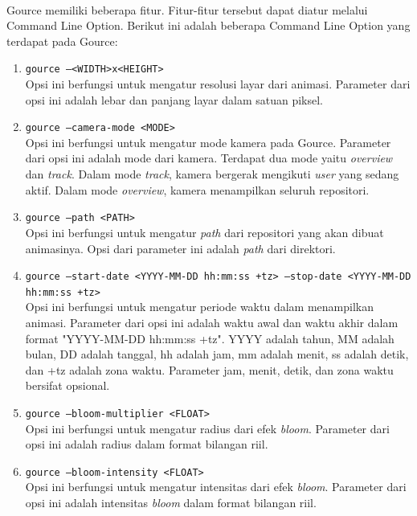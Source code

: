 \ \\
Gource memiliki beberapa fitur. Fitur-fitur tersebut dapat diatur melalui Command Line Option. Berikut ini adalah beberapa Command Line Option yang terdapat pada Gource:
\begin{enumerate}
\item \texttt{gource --<WIDTH>x<HEIGHT>}\\
Opsi ini berfungsi untuk mengatur resolusi layar dari animasi. Parameter dari opsi ini adalah lebar dan panjang layar dalam satuan piksel. 

\item \texttt{gource --camera-mode <MODE>}\\
Opsi ini berfungsi untuk mengatur mode kamera pada Gource. Parameter dari opsi ini adalah mode dari kamera. Terdapat dua mode yaitu \textit{overview} dan \textit{track}. Dalam mode \textit{track}, kamera bergerak mengikuti \textit{user} yang sedang aktif. Dalam mode \textit{overview}, kamera menampilkan seluruh repositori.

\item \texttt{gource --path <PATH>}\\
Opsi ini berfungsi untuk mengatur \textit{path} dari repositori yang akan dibuat animasinya. Opsi dari parameter ini adalah \textit{path} dari direktori.

\item \texttt{gource --start-date <YYYY-MM-DD hh:mm:ss +tz> --stop-date <YYYY-MM-DD hh:mm:ss +tz>}\\
Opsi ini berfungsi untuk mengatur periode waktu dalam menampilkan animasi. Parameter dari opsi ini adalah waktu awal dan waktu akhir dalam format "YYYY-MM-DD hh:mm:ss +tz". YYYY adalah tahun, MM adalah bulan, DD adalah tanggal, hh adalah jam, mm adalah menit, ss adalah detik, dan +tz adalah zona waktu. Parameter jam, menit, detik, dan zona waktu bersifat opsional.    

\item \texttt{gource --bloom-multiplier <FLOAT> }\\
Opsi ini berfungsi untuk mengatur radius dari efek \textit{bloom}. Parameter dari opsi ini adalah radius dalam format bilangan riil.

\item \texttt{gource --bloom-intensity <FLOAT>}\\
Opsi ini berfungsi untuk mengatur intensitas dari efek \textit{bloom}. Parameter dari opsi ini adalah intensitas \textit{bloom} dalam format bilangan riil.


\end{enumerate}
